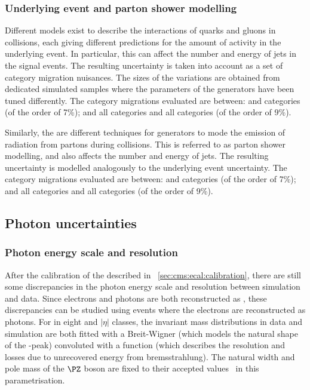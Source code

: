 \subsubsection{Underlying event and parton shower modelling}
Different models exist to describe the interactions of quarks and gluons in \pp collisions, each giving different predictions for the amount of activity in the underlying event. In particular, this can affect the number and energy of jets in the signal events. The resulting uncertainty is taken into account as a set of category migration nuisances. The sizes of the variations are obtained from dedicated simulated samples where the parameters of the generators have been tuned differently. The category migrations evaluated are between:  and  categories (of the order of 7\%); and all \VBFTag categories and all \Untagged categories (of the order of 9\%).

Similarly, the are different techniques for generators to mode the emission of \QCD radiation from partons during \pp collisions. This is referred to as parton shower modelling, and also affects the number and energy of jets. The resulting uncertainty is modelled analogously to the underlying event uncertainty. The category migrations evaluated are between:  and  categories (of the order of 7\%); and all \VBFTag categories and all \Untagged categories (of the order of 9\%).


\subsection{Photon uncertainties}

\subsubsection{Photon energy scale and resolution}
After the calibration of the \ECAL described in \Sec~\ref{sec:cms:ecal:calibration}, there are still some discrepancies in the photon energy scale and resolution between simulation and data. Since electrons and photons are both reconstructed as \SC\s, these discrepancies can be studied using \Zee events where the electrons are reconstructed as photons.
For \SC\s in eight \RNINE and $|\eta|$ classes, the invariant mass distributions in data and simulation are both fitted with a Breit-Wigner (which models the natural shape of the \PZ-peak) convoluted with a \CB function (which describes the \ECAL resolution and losses due to unrecovered energy from bremsstrahlung). The natural width and pole mass of the $\PZ$ boson are fixed to their accepted values~\cite{PDGBooklet} in this parametrisation. 

